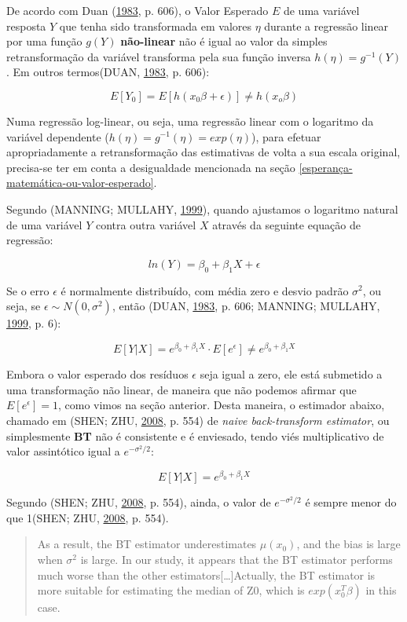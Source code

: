 \documentclass[a4paper]{article}
\begin{document}
De acordo com Duan (\protect\hyperlink{ref-Duan}{1983}, p. 606), o Valor
Esperado \(E\) de uma variável resposta \(Y\) que tenha sido
transformada em valores \(\eta\) durante a regressão linear por uma
função \(g(Y)\) \textbf{não-linear} não é igual ao valor da simples
retransformação da variável transforma pela sua função inversa
\(h(\eta) = g^{-1}(Y)\). Em outros termos(DUAN,
\protect\hyperlink{ref-Duan}{1983}, p. 606):

\[E[Y_0] = E[h(x_0\beta + \epsilon)] \ne h(x_o\beta)\]

Numa regressão log-linear, ou seja, uma regressão linear com o logaritmo
da variável dependente (\(h(\eta) = g^{-1}(\eta) = exp(\eta)\)), para
efetuar apropriadamente a retransformação das estimativas de volta a sua
escala original, precisa-se ter em conta a desigualdade mencionada na
seção \ref{esperança-matemática-ou-valor-esperado}.

Segundo (MANNING; MULLAHY, \protect\hyperlink{ref-NBERt0246}{1999}),
quando ajustamos o logaritmo natural de uma variável \(Y\) contra outra
variável \(X\) através da seguinte equação de regressão:

\[ln(Y) = \beta_0 + \beta_1X + \epsilon\]

Se o erro \(\epsilon\) é normalmente distribuído, com média zero e
desvio padrão \(\sigma^2\), ou seja, se
\(\epsilon \sim N(0, \sigma^2)\), então (DUAN,
\protect\hyperlink{ref-Duan}{1983}, p. 606; MANNING; MULLAHY,
\protect\hyperlink{ref-NBERt0246}{1999}, p. 6):

\[E[Y|X] = e^{\beta_0 + \beta_1X} \cdot E[e^\epsilon] \ne e^{\beta_0 + \beta_1X}\]

Embora o valor esperado dos resíduos \(\epsilon\) seja igual a zero, ele
está submetido a uma transformação não linear, de maneira que não
podemos afirmar que \(E[e^\epsilon] = 1\), como vimos na seção anterior.
Desta maneira, o estimador abaixo, chamado em (SHEN; ZHU,
\protect\hyperlink{ref-shen}{2008}, p. 554) de \emph{naive
back-transform estimator}, ou simplesmente \textbf{BT} não é consistente
e é enviesado, tendo viés multiplicativo de valor assintótico igual a
\(e^{-\sigma^2/2}\):

\[E[Y|X] = e^{\beta_0 + \beta_1X}\]

Segundo (SHEN; ZHU, \protect\hyperlink{ref-shen}{2008}, p. 554), ainda,
o valor de \(e^{-\sigma^2/2}\) é sempre menor do que 1(SHEN; ZHU,
\protect\hyperlink{ref-shen}{2008}, p. 554).

\begin{quote}
As a result, the BT estimator underestimates \(\mu(x_0)\), and the bias
is large when \(\sigma^2\) is large. In our study, it appears that the
BT estimator performs much worse than the other
estimators{[}\ldots{}{]}Actually, the BT estimator is more suitable for
estimating the median of Z0, which is \(exp(x_0^T\beta)\) in this case.
\end{quote}
\end{document}
